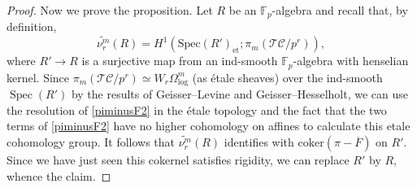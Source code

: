 \documentclass{amsart}
\theoremstyle{definition}
\begin{document}
\begin{proof}
Now we prove the proposition.  Let $R$ be an $\mathbb{F}_p$-algebra and recall that, by definition,
$$\widetilde{\nu_r^{m}}(R) = H^1( \mathrm{Spec}(R')_{\mathrm{et}}; \pi_m (
\mathcal{TC}/p^r)),$$
where $R'\rightarrow R$ is a surjective map from an ind-smooth
$\mathbb{F}_p$-algebra with henselian kernel. Since $\pi_m ( \mathcal{TC}/p^r)
\simeq W_r \Omega^{m}_{\mathrm{log}}$ (as
\'etale sheaves) over the ind-smooth $\operatorname{Spec}(R')$ by the
results of Geisser--Levine and Geisser--Hesselholt, we can use the resolution of 
\eqref{piminusF2} in the \'etale topology and the fact that the two terms of
\eqref{piminusF2} have no higher cohomology on affines to calculate this etale cohomology group. It follows that 
$\widetilde{\nu_r^{m}}(R)$ identifies with $\mathrm{coker}( \pi - \overline{F})$ on $R'$. Since we have just seen this cokernel satisfies
rigidity, we can replace $R'$ by $R$, whence the claim. 
\end{proof} 



\end{document}
